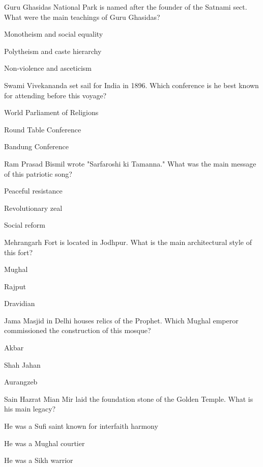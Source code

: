 
\begin{enhancedmcq}{Guru Ghasidas National Park is named after the founder of the Satnami sect. What were the main teachings of Guru Ghasidas?}
\item Monotheism and social equality
\item Polytheism and caste hierarchy
\item Non‑violence and asceticism

\end{enhancedmcq}
\begin{enhancedmcq}{Swami Vivekananda set sail for India in 1896. Which conference is he best known for attending before this voyage?}
\item World Parliament of Religions
\item Round Table Conference
\item Bandung Conference

\end{enhancedmcq}
\begin{enhancedmcq}{Ram Prasad Bismil wrote "Sarfaroshi ki Tamanna." What was the main message of this patriotic song?}
\item Peaceful resistance
\item Revolutionary zeal
\item Social reform

\end{enhancedmcq}
\begin{enhancedmcq}{Mehrangarh Fort is located in Jodhpur. What is the main architectural style of this fort?}
\item Mughal
\item Rajput
\item Dravidian

\end{enhancedmcq}
\begin{enhancedmcq}{Jama Masjid in Delhi houses relics of the Prophet. Which Mughal emperor commissioned the construction of this mosque?}
\item Akbar
\item Shah Jahan
\item Aurangzeb

\end{enhancedmcq}
\begin{enhancedmcq}{Sain Hazrat Mian Mir laid the foundation stone of the Golden Temple. What is his main legacy?}
\item He was a Sufi saint known for interfaith harmony
\item He was a Mughal courtier
\item He was a Sikh warrior

\end{enhancedmcq}
